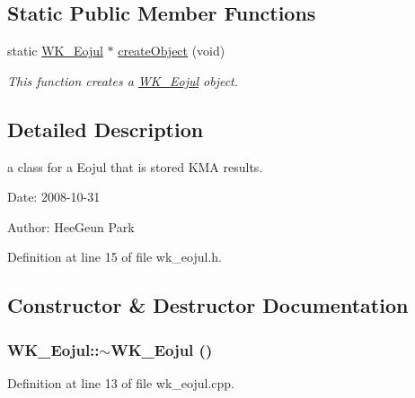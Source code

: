 \subsection*{Static Public Member Functions}
\begin{CompactItemize}
\item 
static \hyperlink{classWK__Eojul}{WK\_\-Eojul} $\ast$ \hyperlink{classWK__Eojul_46148f4762f080b15e5bd8e21f98a8a8}{createObject} (void)
\begin{CompactList}\small\item\em This function creates a \hyperlink{classWK__Eojul}{WK\_\-Eojul} object. \item\end{CompactList}\end{CompactItemize}


\subsection{Detailed Description}
a class for a Eojul that is stored KMA results. 

\begin{Desc}
\item[Date:]2008-10-31 \end{Desc}
\begin{Desc}
\item[Author:]HeeGeun Park \end{Desc}


Definition at line 15 of file wk\_\-eojul.h.

\subsection{Constructor \& Destructor Documentation}
\hypertarget{classWK__Eojul_ea467188fd903acf353d8bdf586196de}{
\subsubsection[{$\sim$WK\_\-Eojul}]{\setlength{\rightskip}{0pt plus 5cm}WK\_\-Eojul::$\sim$WK\_\-Eojul ()}}
\label{classWK__Eojul_ea467188fd903acf353d8bdf586196de}




Definition at line 13 of file wk\_\-eojul.cpp.

